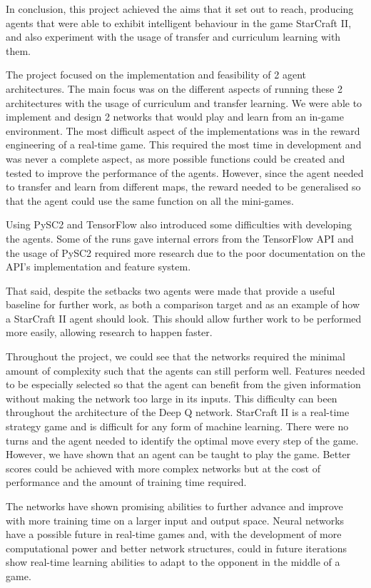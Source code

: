 In conclusion, this project achieved the aims that it set out to reach,
producing agents that were able to exhibit intelligent behaviour in the game
StarCraft II, and also experiment with the usage of transfer and curriculum
learning with them.

The project focused on the implementation and feasibility of 2 agent
architectures. The main focus was on the different aspects of running these 2
architectures with the usage of curriculum and transfer learning. We were able
to implement and design 2 networks that would play and learn from an in-game
environment. The most difficult aspect of the implementations was in the reward
engineering of a real-time game. This required the most time in development and
was never a complete aspect, as more possible functions could be created and
tested to improve the performance of the agents. However, since the agent needed
to transfer and learn from different maps, the reward needed to be generalised
so that the agent could use the same function on all the mini-games.

Using PySC2 and TensorFlow also introduced some difficulties with developing the
agents. Some of the runs gave internal errors from the TensorFlow API and the
usage of PySC2 required more research due to the poor documentation on the API's
implementation and feature system.

That said, despite the setbacks two agents were made that provide a useful
baseline for further work, as both a comparison target and as an example of how
a StarCraft II agent should look. This should allow further work to be performed
more easily, allowing research to happen faster.

Throughout the project, we could see that the networks required the minimal
amount of complexity such that the agents can still perform well. Features
needed to be especially selected so that the agent can benefit from the given
information without making the network too large in its inputs. This difficulty
can been throughout the architecture of the Deep Q network. StarCraft II is a
real-time strategy game and is difficult for any form of machine learning. There
were no turns and the agent needed to identify the optimal move every step of
the game. However, we have shown that an agent can be taught to play the game.
Better scores could be achieved with more complex networks but at the cost of
performance and the amount of training time required.

The networks have shown promising abilities to further advance and improve with
more training time on a larger input and output space. Neural networks have a
possible future in real-time games and, with the development of more
computational power and better network structures, could in future iterations
show real-time learning abilities to adapt to the opponent in the middle of a
game.
